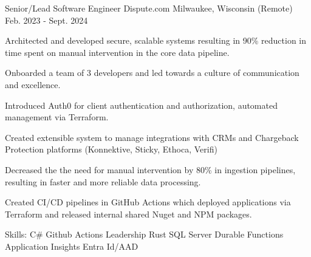 

\begin{cventries}

\cventry
 {Senior/Lead Software Engineer} %
 {Dispute.com} %
 {Milwaukee, Wisconsin (Remote)} %
 {Feb. 2023 - Sept. 2024} %
 {
      \begin{cvitems} %
        \item {Architected and developed secure, scalable systems resulting in 90\% reduction in time spent on 
 manual intervention in the core data pipeline.}
        \item {Onboarded a team of 3 developers and led towards a culture of communication and excellence.}
        \item {Introduced Auth0 for client authentication and authorization, automated management via Terraform.}
        \item {Created extensible system to manage integrations with CRMs and Chargeback Protection platforms (Konnektive, Sticky, Ethoca, Verifi)}
        \item {Decreased the the need for manual intervention by 80\% in ingestion pipelines, resulting in faster and more reliable data processing.}
        \item {Created CI/CD pipelines in GitHub Actions which deployed applications via Terraform and released internal shared Nuget and NPM packages.}
        \item {Skills: C\# \textbullet{} Github Actions \textbullet{} Leadership \textbullet{} Rust \textbullet{} SQL Server \textbullet{} Durable Functions \textbullet{} Application Insights \textbullet{} Entra Id/AAD}
      \end{cvitems}
 }


\end{cventries}

